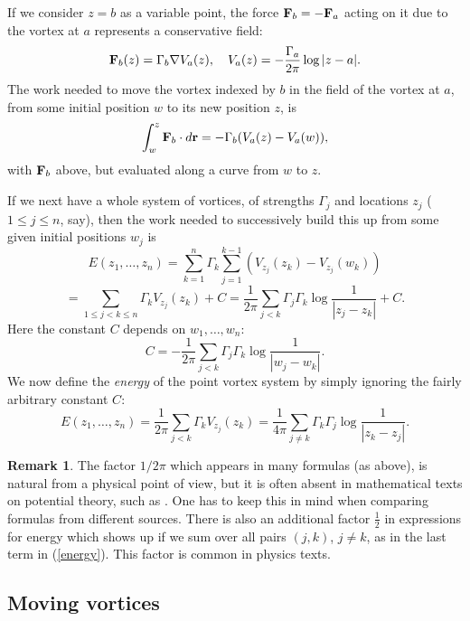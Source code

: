 \documentclass[reqno,12pt]{article}
\theoremstyle{plain}
\theoremstyle{definition}
\newtheorem{remark}[defn]{Remark}
\numberwithin{equation}{section}
\numberwithin{figure}{section}
\begin{document}
If we consider $z=b$ as a variable point, the force ${\bf F}_b=-{\bf F}_a$ acting on it 
due to the vortex at $a$ represents  a conservative field:
$$
{\bf F}_b(z)=\Gamma_b\nabla V_a(z), \quad V_a(z)=-\frac{\Gamma_a}{2\pi}\log{|z-a|}.
$$ 
The work needed to move the vortex indexed by  $b$ in the field of the vortex at $a$,
from some initial position $w$ to its new position $z$, is
$$
\int_w^z {\bf F}_b\cdot d{\bf r}=-\Gamma_b (V_a(z)-V_a(w)),
$$
with ${\bf F}_b$ above, but evaluated along a curve from $w$ to $z$.

If we next have a whole system of vortices, of strengths $\Gamma_j$ and locations $z_j$ ($1\leq j\leq n$, say), then the work
needed to successively build this up from some given initial positions $w_j$ is
$$
E(z_1,\dots,z_n)=\sum_{k=1}^n\Gamma_k \sum_{j=1}^{k-1}(V_{z_j}(z_k)-V_{z_j}(w_k))
$$  
$$
=\sum_{1\leq j<k\leq n}\Gamma_kV_{z_j}(z_k)+C
=\frac{1}{2\pi}\sum_{j<k}\Gamma_j\Gamma_k \log\frac{1}{|z_j-z_k|}+C.
$$
Here the constant $C$ depends on $w_1,\dots,w_n$:
$$
C=-\frac{1}{2\pi}\sum_{j<k}\Gamma_j\Gamma_k \log\frac{1}{|w_j-w_k|}.
$$
We now define the {\it energy} of the point vortex system by simply ignoring 
the fairly arbitrary constant $C$:
\begin{equation}\label{energy}
E(z_1,\dots, z_n)
=\frac{1}{2\pi}\sum_{j<k}\Gamma_k V_{z_j}(z_k)
=\frac{1}{4\pi}\sum_{j\ne k}\Gamma_k \Gamma_j \log \frac{1}{|z_k-z_j|}.
\end{equation}

\begin{remark}\label{rem:2pi}
The factor $1/2\pi$ which appears in many formulas (as above), is natural from a physical point of view,
but it is often absent in mathematical texts on potential theory, such as
\cite{Sario-Oikawa-1969, Landkof-1972, Ahlfors-1973, Doob-1984, Ransford-1995, Saff-Totik-1997, Armitage-Gardiner-2001, Helms-2014}.
One has to keep this in mind when comparing formulas from different sources.
There is also an additional factor $\frac{1}{2}$ in expressions for energy which shows up if we sum over all pairs $(j,k)$, $j\ne k$,
as in the last term in (\ref{energy}). This factor is common in physics texts.
\end{remark}


\subsection{Moving vortices}\label{sec:moving vortices}
\end{document}
